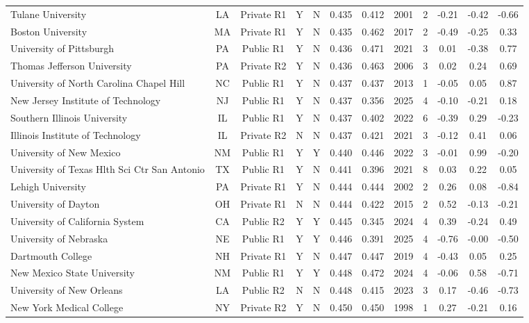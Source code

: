 \begin{longtable}{@{}p{3.55cm}ccccccccccc@{}}
Tulane University & LA & Private R1 & Y & N & 0.435 & 0.412 & 2001 & 2 & -0.21 & -0.42 & -0.66 \\
Boston University & MA & Private R1 & Y & N & 0.435 & 0.462 & 2017 & 2 & -0.49 & -0.25 & 0.33 \\
University of Pittsburgh & PA & Public R1 & Y & N & 0.436 & 0.471 & 2021 & 3 & 0.01 & -0.38 & 0.77 \\
Thomas Jefferson University & PA & Private R2 & Y & N & 0.436 & 0.463 & 2006 & 3 & 0.02 & 0.24 & 0.69 \\
University of North Carolina Chapel Hill & NC & Public R1 & Y & N & 0.437 & 0.437 & 2013 & 1 & -0.05 & 0.05 & 0.87 \\
New Jersey Institute of Technology & NJ & Public R1 & Y & N & 0.437 & 0.356 & 2025 & 4 & -0.10 & -0.21 & 0.18 \\
Southern Illinois University & IL & Public R1 & Y & N & 0.437 & 0.402 & 2022 & 6 & -0.39 & 0.29 & -0.23 \\
Illinois Institute of Technology & IL & Private R2 & N & N & 0.437 & 0.421 & 2021 & 3 & -0.12 & 0.41 & 0.06 \\
University of New Mexico & NM & Public R1 & Y & Y & 0.440 & 0.446 & 2022 & 3 & -0.01 & 0.99 & -0.20 \\
University of Texas Hlth Sci Ctr San Antonio & TX & Public R1 & Y & N & 0.441 & 0.396 & 2021 & 8 & 0.03 & 0.22 & 0.05 \\
Lehigh University & PA & Private R1 & Y & N & 0.444 & 0.444 & 2002 & 2 & 0.26 & 0.08 & -0.84 \\
University of Dayton & OH & Private R1 & N & N & 0.444 & 0.422 & 2015 & 2 & 0.52 & -0.13 & -0.21 \\
University of California System & CA & Public R2 & Y & Y & 0.445 & 0.345 & 2024 & 4 & 0.39 & -0.24 & 0.49 \\
University of Nebraska & NE & Public R1 & Y & Y & 0.446 & 0.391 & 2025 & 4 & -0.76 & -0.00 & -0.50 \\
Dartmouth College & NH & Private R1 & Y & N & 0.447 & 0.447 & 2019 & 4 & -0.43 & 0.05 & 0.25 \\
New Mexico State University & NM & Public R1 & Y & Y & 0.448 & 0.472 & 2024 & 4 & -0.06 & 0.58 & -0.71 \\
University of New Orleans & LA & Public R2 & N & N & 0.448 & 0.415 & 2023 & 3 & 0.17 & -0.46 & -0.73 \\
New York Medical College & NY & Private R2 & Y & N & 0.450 & 0.450 & 1998 & 1 & 0.27 & -0.21 & 0.16 \\

\end{longtable}
